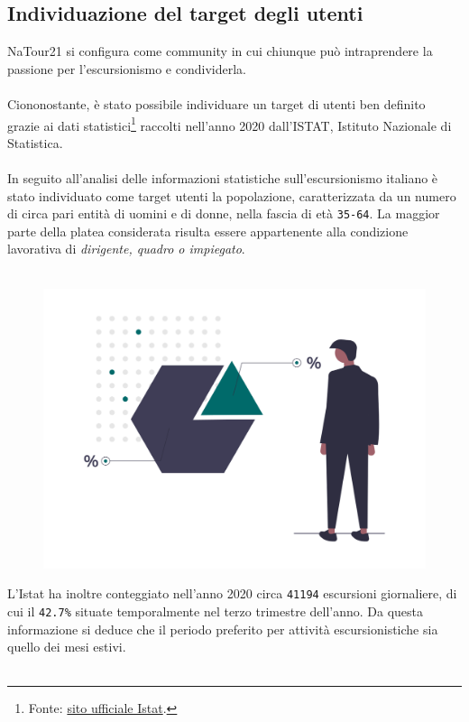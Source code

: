 \documentclass{natourDoc}
\begin{document}
	\subsection{Individuazione del target degli utenti}
	NaTour21 si configura come community in cui chiunque può intraprendere la passione per l'escursionismo e condividerla.\\\\
	Ciononostante, è stato possibile individuare un target di utenti ben definito grazie ai dati 
	statistici\footnote{Fonte: \href{http://dati.istat.it/Index.aspx?DataSetCode=DCCV_ESC_CAPI}{sito ufficiale Istat}.} raccolti 
	nell'anno 2020 dall'ISTAT, Istituto Nazionale di Statistica.\\\\
	In seguito all'analisi delle informazioni statistiche sull'escursionismo italiano è stato individuato come target utenti la popolazione, caratterizzata da un 
	numero di circa pari entità di uomini e di donne, nella fascia di età \texttt{35-64}. La maggior parte della 
	platea considerata risulta essere appartenente alla condizione lavorativa di \textit{dirigente, quadro o impiegato}.\\\\
	\begin{figure}[!htbp]
		\centering
		\includegraphics[width=12cm, page=1]{./logos/undraw_statistic_chart_38b6.png}
	\end{figure}
	\FloatBarrier
	L'Istat ha inoltre conteggiato nell'anno 2020 circa \texttt{41194} escursioni giornaliere,
	di cui il \texttt{42.7\%} situate temporalmente nel terzo trimestre dell'anno. Da questa informazione si deduce che il periodo
	preferito per attività escursionistiche sia quello dei mesi estivi.\\\\
\end{document}
